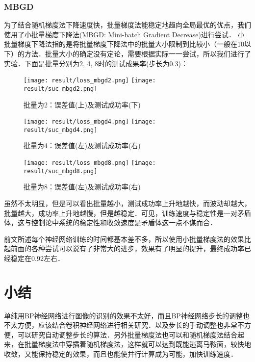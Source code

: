 \documentclass{article}
\begin{document}
  \subsubsection{MBGD}
    为了结合随机梯度法下降速度快，批量梯度法能稳定地趋向全局最优的优点，我们使用了小批量梯度下降法(MBGD: Mini-batch Gradient Decrease)进行尝试．
    小批量梯度下降法指的是将批量梯度下降法中的批量大小限制到比较小（一般在10以下）的方法．批量大小的确定没有定论，需要根据实际一一尝试，所以我们进行了实验．下面是批量分别为2, 4, 8时的测试成果率(步长为0.3)：
  \begin{figure}
    \centering
    \texttt{[image: result/loss\_mbgd2.png]}
    \texttt{[image: result/suc\_mbgd2.png]}
    \caption{批量为2：误差值(上)及测试成功率(下)}
  \end{figure}
  \begin{figure}
    \centering
    \texttt{[image: result/loss\_mbgd4.png]}
    \texttt{[image: result/suc\_mbgd4.png]}
    \caption{批量为4：误差值(左)及测试成功率(右)}
  \end{figure}
  \begin{figure}
    \centering
    \texttt{[image: result/loss\_mbgd8.png]}
    \texttt{[image: result/suc\_mbgd8.png]}
    \caption{批量为8：误差值(左)及测试成功率(右)}
  \end{figure}
  \restoregeometry
    虽然不太明显，但是可以看出批量越小，测试成功率上升地越快，而波动却越大，批量越大，成功率上升地越慢，但是越稳定．可见，训练速度与稳定性是一对矛盾体，这与控制论中系统的稳定性和收敛速度是矛盾体这一点不谋而合．

    前文所述每个神经网络训练的时间都基本差不多，所以使用小批量梯度法的效果比起前面的各种尝试可以说有了非常大的进步，效果有了明显的提升，最终成功率已经稳定在0.92左右．

  \section{小结}
  单纯用BP神经网络进行图像的识别的效果不太好，而且BP神经网络步长的调整也不太方便，应该结合卷积神经网络进行相关研究．以及步长的手动调整也非常不方便，可以研究自动调整步长的算法．另外批量梯度法也可以和随机梯度法结合起来，在批量梯度法中穿插着随机梯度法，这样就可以达到既能逃离马鞍面，较快地收敛，又能保持稳定的效果，而且也能使并行计算成为可能，加快训练速度．
\end{document}
